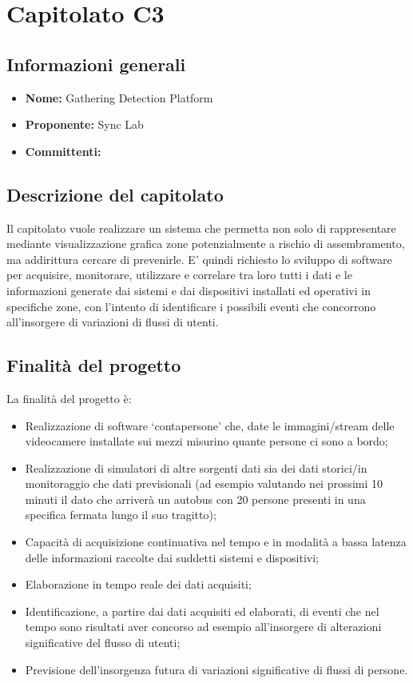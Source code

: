 \section{Capitolato C3}

\subsection{Informazioni generali}
\begin{itemize}
\item \textbf{Nome:}  Gathering Detection Platform 
\item \textbf{Proponente:} Sync Lab 
\item \textbf{Committenti:} \committenti{}
\end{itemize}

\subsection{Descrizione del capitolato}
Il capitolato vuole realizzare un sistema che permetta non solo di rappresentare mediante visualizzazione grafica zone potenzialmente a rischio di assembramento, ma addirittura cercare di prevenirle. E' quindi richiesto lo sviluppo di software per acquisire, monitorare, utilizzare e correlare tra loro tutti i dati e le informazioni generate dai sistemi e dai dispositivi installati ed operativi in specifiche zone, con l'intento di identificare i possibili eventi che concorrono all'insorgere di variazioni di flussi di utenti. 
\subsection{Finalità del progetto}
La finalità del progetto è:
\begin{itemize}
\item Realizzazione di software ‘contapersone’ che, date le immagini/stream delle videocamere installate sui mezzi misurino quante persone ci sono a bordo;
\item Realizzazione di simulatori di altre sorgenti dati sia dei dati storici/in monitoraggio che dati previsionali
(ad esempio valutando nei prossimi 10 minuti il dato che arriverà un autobus con 20 persone presenti
in una specifica fermata lungo il suo tragitto);
\item Capacità di acquisizione continuativa nel tempo e in modalità a bassa latenza delle informazioni
raccolte dai suddetti sistemi e dispositivi;
\item Elaborazione in tempo reale dei dati acquisiti;
\item Identificazione, a partire dai dati acquisiti ed elaborati, di eventi che nel tempo sono risultati aver
concorso ad esempio all'insorgere di alterazioni significative del flusso di utenti;
\item Previsione dell'insorgenza futura di variazioni significative di flussi di persone.
\end{itemize}

